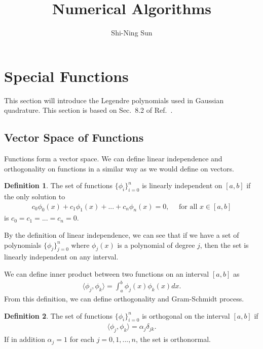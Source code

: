 \documentclass{revtex4-2}
\theoremstyle{definition}
\newtheorem{definition}{Definition}
\begin{document}
\title{Numerical Algorithms}
\author{Shi-Ning Sun}
\maketitle

\section{Special Functions}

This section will introduce the Legendre polynomials used in Gaussian quadrature. This section is based on Sec.~8.2
of Ref.~\cite{burden_and_faires}.

\subsection{Vector Space of Functions}

Functions form a vector space. We can define linear independence and orthogonality on functions in a similar way as
we would define on vectors.

\begin{definition}
    The set of functions $\{\phi_i\}_{i = 0}^n$ is linearly independent on $[a, b]$ if the only solution to
    \begin{align}
        c_0 \phi_0(x) + c_1\phi_1(x) + ... + c_n\phi_n(x) = 0, \quad \text{ for all } x \in [a, b]
    \end{align}
    is $c_0 = c_1 = ... = c_n = 0$. 
\end{definition}

By the definition of linear independence, we can see that if we have a set of polynomials $\{\phi_j\}_{j=0}^n$ where
$\phi_j(x)$ is a polynomial of degree $j$, then the set is linearly independent on any interval.

We can define inner product between two functions on an interval $[a, b]$ as
\begin{align}
    \langle \phi_j, \phi_k\rangle = \int_a^b \phi_j(x) \phi_k(x) dx.
\end{align}
From this definition, we can define orthogonality and Gram-Schmidt process.

\begin{definition}
    The set of functions $\{\phi_i\}_{i = 0}^n$ is orthogonal on the interval $[a, b]$ if 
    \begin{align}
        \langle \phi_j, \phi_k\rangle = \alpha_j \delta_{jk}.
    \end{align}
    If in addition $\alpha_j = 1$ for each $j = 0, 1, ..., n$, the set is orthonormal.
\end{definition}
\end{document}
